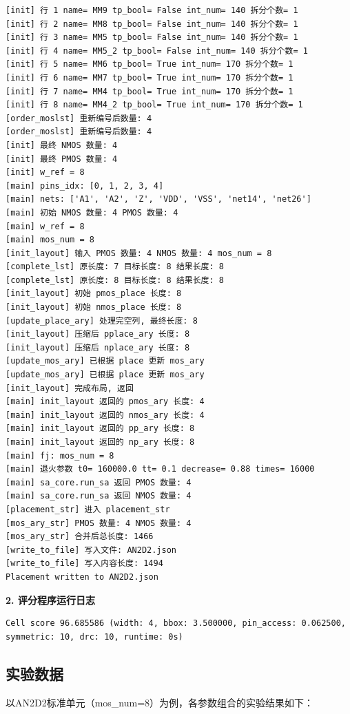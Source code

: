 \documentclass[UTF8,12pt,a4paper]{ctexart}
\begin{document}
\begin{lstlisting}[style=terminal,caption={模拟退火算法运行日志（2000\_1\_88\_2000示例）}]
[init] 行 1 name= MM9 tp_bool= False int_num= 140 拆分个数= 1
[init] 行 2 name= MM8 tp_bool= False int_num= 140 拆分个数= 1
[init] 行 3 name= MM5 tp_bool= False int_num= 140 拆分个数= 1
[init] 行 4 name= MM5_2 tp_bool= False int_num= 140 拆分个数= 1
[init] 行 5 name= MM6 tp_bool= True int_num= 170 拆分个数= 1
[init] 行 6 name= MM7 tp_bool= True int_num= 170 拆分个数= 1
[init] 行 7 name= MM4 tp_bool= True int_num= 170 拆分个数= 1
[init] 行 8 name= MM4_2 tp_bool= True int_num= 170 拆分个数= 1
[order_moslst] 重新编号后数量: 4
[order_moslst] 重新编号后数量: 4
[init] 最终 NMOS 数量: 4
[init] 最终 PMOS 数量: 4
[init] w_ref = 8
[main] pins_idx: [0, 1, 2, 3, 4]
[main] nets: ['A1', 'A2', 'Z', 'VDD', 'VSS', 'net14', 'net26']
[main] 初始 NMOS 数量: 4 PMOS 数量: 4
[main] w_ref = 8
[main] mos_num = 8
[init_layout] 输入 PMOS 数量: 4 NMOS 数量: 4 mos_num = 8
[complete_lst] 原长度: 7 目标长度: 8 结果长度: 8
[complete_lst] 原长度: 8 目标长度: 8 结果长度: 8
[init_layout] 初始 pmos_place 长度: 8
[init_layout] 初始 nmos_place 长度: 8
[update_place_ary] 处理完空列, 最终长度: 8
[init_layout] 压缩后 pplace_ary 长度: 8
[init_layout] 压缩后 nplace_ary 长度: 8
[update_mos_ary] 已根据 place 更新 mos_ary
[update_mos_ary] 已根据 place 更新 mos_ary
[init_layout] 完成布局, 返回
[main] init_layout 返回的 pmos_ary 长度: 4
[main] init_layout 返回的 nmos_ary 长度: 4
[main] init_layout 返回的 pp_ary 长度: 8
[main] init_layout 返回的 np_ary 长度: 8
[main] fj: mos_num = 8
[main] 退火参数 t0= 160000.0 tt= 0.1 decrease= 0.88 times= 16000
[main] sa_core.run_sa 返回 PMOS 数量: 4
[main] sa_core.run_sa 返回 NMOS 数量: 4
[placement_str] 进入 placement_str
[mos_ary_str] PMOS 数量: 4 NMOS 数量: 4
[mos_ary_str] 合并后总长度: 1466
[write_to_file] 写入文件: AN2D2.json
[write_to_file] 写入内容长度: 1494
Placement written to AN2D2.json
\end{lstlisting}

\textbf{2. 评分程序运行日志}
\begin{lstlisting}[style=terminal,caption={评分程序运行日志（2000\_1\_88\_2000示例）}]
Cell score 96.685586 (width: 4, bbox: 3.500000, pin_access: 0.062500, symmetric: 10, drc: 10, runtime: 0s)
\end{lstlisting}

\subsection{实验数据}

以AN2D2标准单元（mos\_num=8）为例，各参数组合的实验结果如下：
\end{document}
